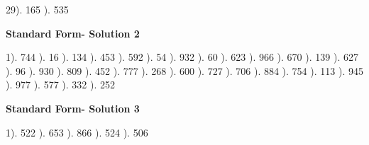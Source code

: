 \documentclass{article}%
\begin{document}
29). 165%
). 535%
\newline%
\newpage%
\large%
\begin{center}%
\textbf{Standard Form- Solution 2}%
\newline%
\end{center} \normalsize%
1). 744%
). 16%
). 134%
). 453%
). 592%
). 54%
). 932%
). 60%
). 623%
). 966%
). 670%
). 139%
). 627%
). 96%
). 930%
). 809%
). 452%
). 777%
). 268%
). 600%
). 727%
). 706%
). 884%
). 754%
). 113%
). 945%
). 977%
). 577%
). 332%
). 252%
\newline%
\newpage%
\large%
\begin{center}%
\textbf{Standard Form- Solution 3}%
\newline%
\end{center} \normalsize%
1). 522%
). 653%
). 866%
). 524%
). 506%
\end{document}
